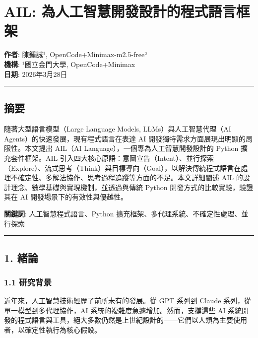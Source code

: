 \section{AIL:
為人工智慧開發設計的程式語言框架}\label{ail-ux70baux4ebaux5de5ux667aux6167ux958bux767cux8a2dux8a08ux7684ux7a0bux5f0fux8a9eux8a00ux6846ux67b6}

\textbf{作者}: 陳鍾誠¹, OpenCode+Minimax-m2.5-free²\\
\textbf{機構}: ¹國立金門大學, OpenCode+Minimax\\
\textbf{日期}: 2026年3月28日

\begin{center}\rule{0.5\linewidth}{0.5pt}\end{center}

\subsection{摘要}\label{ux6458ux8981}

隨著大型語言模型（Large Language Models, LLMs）與人工智慧代理（AI
Agents）的快速發展，現有程式語言在表達 AI
開發獨特需求方面展現出明顯的局限性。本文提出 AIL（AI
Language），一個專為人工智慧開發設計的 Python 擴充套件框架。AIL
引入四大核心原語：意圖宣告（Intent）、並行探索（Explore）、流式思考（Think）與目標導向（Goal），以解決傳統程式語言在處理不確定性、多解法協作、思考過程追蹤等方面的不足。本文詳細闡述
AIL 的設計理念、數學基礎與實現機制，並透過與傳統 Python
開發方式的比較實驗，驗證其在 AI 開發場景下的有效性與優越性。

\textbf{關鍵詞}: 人工智慧程式語言、Python
擴充框架、多代理系統、不確定性處理、並行探索

\begin{center}\rule{0.5\linewidth}{0.5pt}\end{center}

\subsection{1. 緒論}\label{ux7dd2ux8ad6}

\subsubsection{1.1 研究背景}\label{ux7814ux7a76ux80ccux666f}

近年來，人工智慧技術經歷了前所未有的發展。從 GPT 系列到 Claude
系列，從單一模型到多代理協作，AI 系統的複雜度急遽增加。然而，支撐這些 AI
系統開發的程式語言與工具，絕大多數仍然是上世紀設計的------它們以人類為主要使用者，以確定性執行為核心假設。

